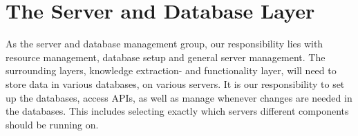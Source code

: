 \section{The Server and Database Layer}

As the server and database management group, our responsibility lies with resource management, database setup and general server management. The surrounding layers, knowledge extraction- and functionality layer, will need to store data in various databases, on various servers. It is our responsibility to set up the databases, access APIs, as well as manage whenever changes are needed in the databases. This includes selecting exactly which servers different components should be running on.

